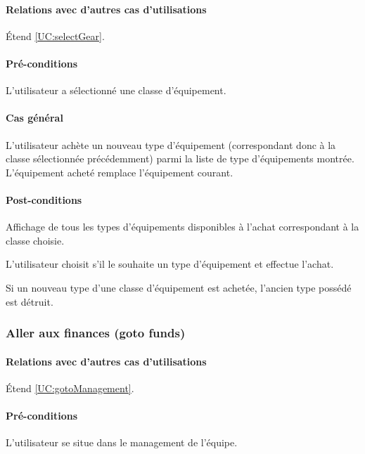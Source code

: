 \paragraph{Relations avec d'autres cas d'utilisations}
Étend \ref{UC:selectGear}.
\paragraph{Pré-conditions}
\begin{list}{}{\leftmargin=1.5em}
\item{L'utilisateur a sélectionné une classe d'équipement.}
\end{list}
\paragraph{Cas général}
L'utilisateur achète un nouveau type d'équipement (correspondant donc à la classe sélectionnée précédemment) parmi la liste de type d'équipements montrée. L'équipement acheté remplace l'équipement courant. 
\paragraph{Post-conditions}
\begin{list}{}{\leftmargin=1.5em}
\item{Affichage de tous les types d'équipements disponibles à l'achat correspondant à la classe choisie.}
\item{L'utilisateur choisit s'il le souhaite un type d'équipement et effectue l'achat.}
\item{Si un nouveau type d'une classe d'équipement est achetée, l'ancien type possédé est détruit.}
\end{list}

\subsubsection{Aller aux finances (goto funds)}
\label{UC:gotoFunds}
\paragraph{Relations avec d'autres cas d'utilisations}
Étend \ref{UC:gotoManagement}.
\paragraph{Pré-conditions}
\begin{list}{}{\leftmargin=1.5em}
\item{L'utilisateur se situe dans le management de l'équipe.}
\end{list}
